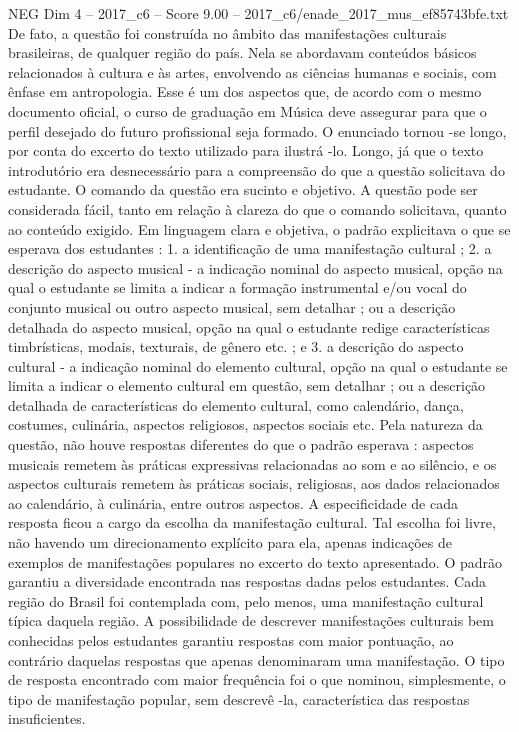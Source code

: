 \begin{textsample}{NEG Dim 4 – 2017\_c6 – Score 9.00 – 2017\_c6/enade\_2017\_mus\_ef85743bfe.txt}
De fato, a questão foi construída no âmbito das manifestações culturais brasileiras, de qualquer região do país.
Nela se abordavam conteúdos básicos relacionados à cultura e às artes, envolvendo as ciências humanas e sociais, com ênfase em antropologia.
Esse é um dos aspectos que, de acordo com o mesmo documento oficial, o curso de graduação em Música deve assegurar para que o perfil desejado do futuro profissional seja formado.
O enunciado tornou -se longo, por conta do excerto do texto utilizado para ilustrá -lo.
Longo, já que o texto introdutório era desnecessário para a compreensão do que a questão solicitava do estudante.
O comando da questão era sucinto e objetivo.
A questão pode ser considerada fácil, tanto em relação à clareza do que o comando solicitava, quanto ao conteúdo exigido.
Em linguagem clara e objetiva, o padrão explicitava o que se esperava dos estudantes : 1. a identificação de uma manifestação cultural ; 2. a descrição do aspecto musical - a indicação nominal do aspecto musical, opção na qual o estudante se limita a indicar a formação instrumental e/ou vocal do conjunto musical ou outro aspecto musical, sem detalhar ; ou a descrição detalhada do aspecto musical, opção na qual o estudante redige características timbrísticas, modais, texturais, de gênero etc. ; e 3. a descrição do aspecto cultural - a indicação nominal do elemento cultural, opção na qual o estudante se limita a indicar o elemento cultural em questão, sem detalhar ; ou a descrição detalhada de características do elemento cultural, como calendário, dança, costumes, culinária, aspectos religiosos, aspectos sociais etc.
Pela natureza da questão, não houve respostas diferentes do que o padrão esperava : aspectos musicais remetem às práticas expressivas relacionadas ao som e ao silêncio, e os aspectos culturais remetem às práticas sociais, religiosas, aos dados relacionados ao calendário, à culinária, entre outros aspectos.
A especificidade de cada resposta ficou a cargo da escolha da manifestação cultural.
Tal escolha foi livre, não havendo um direcionamento explícito para ela, apenas indicações de exemplos de manifestações populares no excerto do texto apresentado.
O padrão garantiu a diversidade encontrada nas respostas dadas pelos estudantes.
Cada região do Brasil foi contemplada com, pelo menos, uma manifestação cultural típica daquela região.
A possibilidade de descrever manifestações culturais bem conhecidas pelos estudantes garantiu respostas com maior pontuação, ao contrário daquelas respostas que apenas denominaram uma manifestação.
O tipo de resposta encontrado com maior frequência foi o que nominou, simplesmente, o tipo de manifestação popular, sem descrevê -la, característica das respostas insuficientes.

\end{textsample}
